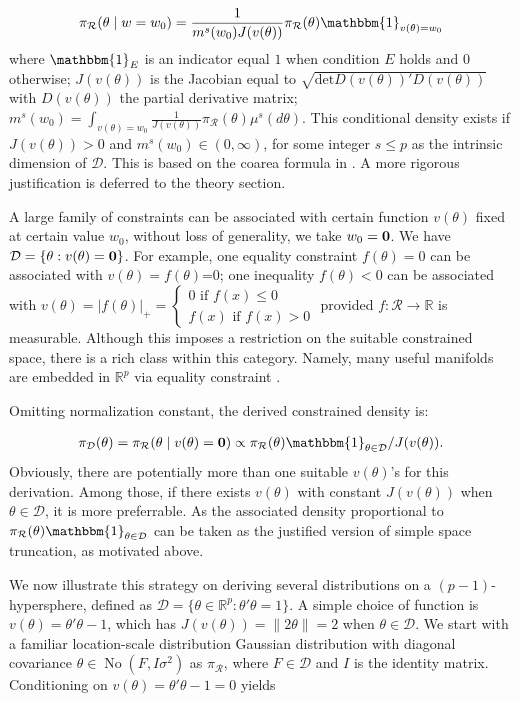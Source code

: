 \documentclass[10pt,fleqn]{article}
\newcommand{\be}{\begin{equation}\begin{aligned}}
\newcommand{\ee}{\end{aligned}\end{equation}}
\newcommand{\bb}[1]{\mathbb{#1}}
\newcommand{\mc}[1]{\mathcal{#1}}
\DeclareMathOperator{\No}{No}
\DeclareMathOperator{\1}{\mathbbm{1}}
\begin{document}
\be
\pi_{\mc R}(\theta \mid w=w_0) = \frac{1}{m^s(w_0) J(v(\theta))} \pi_{\mc R}(\theta) \mathbbm{1}_{v(\theta)=w_0}
\ee
where $\mathbbm{1}_{E}$ is an indicator equal $1$ when condition
$E$ holds and $0$ otherwise; $J(v(\theta))$ is the Jacobian equal to
$\sqrt{\mbox{det}D(v(\theta))'
D(v(\theta))}$ with $D(v(\theta))$ the partial derivative matrix; $m^s(w_0)=\int_{v(\theta)=w_0} \frac{1}{J(v(\theta))} \pi_{\mc R}(\theta) \mu^s(d\theta) $. This conditional density exists
if $J(v(\theta))>0$ and $m^s(w_0)\in(0,\infty)$, for some integer $s\le p$ as the intrinsic dimension of $\mc D$. This is based on the coarea
formula in \cite{federer2014geometric}. A more rigorous justification
is deferred to the theory section.

A large family of constraints can be
associated with certain function $v(\theta)$ fixed at certain value $w_0$, without
loss of generality, we take $w_0=\bf 0$. We have
 $\mc D =\{\theta:
v(\theta)={\bf 0}\}$. For example, one
equality constraint $f(\theta)=0$ can be associated with $v(\theta)=f(\theta)$=0;
one inequality $f(\theta)<0$ can be associated with $v(\theta)=|f(\theta)|_+=\left\{\begin{array}{cc}  0 \text{ if } f(x)\le 0
\\ f(x) \text{ if } f(x)> 0\end{array}\right.$ provided $f:\mc R\rightarrow \bb R$ is measurable. Although this imposes a
restriction  on the suitable constrained space, there is a rich class within this category. Namely, many useful manifolds are embedded in $\bb R^p$ via equality
constraint \citep{do2016differential}. 

Omitting normalization constant, the derived constrained density is:

\be
\label{constrainedDensity}
\pi_{\mc D}(\theta)=\pi_{\mc R}(\theta\mid v(\theta)={\bf 0})\propto \pi_{\mc R}(\theta) \mathbbm{1}_{\theta\in \mc
D}/J(v(\theta)).
\ee
Obviously, there are potentially more than one suitable $v(\theta)$'s for
this derivation. Among those, if there exists $v(\theta)$ with constant
$J(v(\theta))$ when $\theta\in\mc D$, it is more preferrable. As the associated
density proportional to $\pi_{\mc R}(\theta) \mathbbm{1}_{\theta\in \mc
D}$ can be taken as the justified version of simple space truncation, as motivated above.

 
We now illustrate this strategy on deriving several distributions on a $(p-1)$-hypersphere, defined as $\mc
D=\{\theta\in
\bb R^p:\theta'\theta=1\}$. A simple choice of  function is $v(\theta)=\theta'\theta-1$,
which has $J(v(\theta))=\|2\theta\|=2$ when $\theta\in \mc D$.
 We start with a familiar
location-scale distribution Gaussian distribution with diagonal
covariance $\theta \in \No(F,I\sigma^2)$ as $\pi_{\mc
R}$, where $F\in \mc D $ and $I$ is the identity matrix. Conditioning on $v(\theta)=\theta'\theta-1=0$ yields
\end{document}
